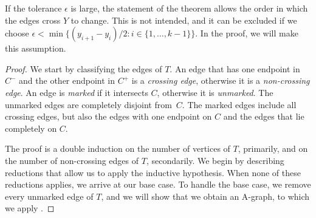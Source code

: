 If the tolerance $\epsilon$ is large, 
the statement of the theorem allows the order in which the edges cross
$Y$ to change. This is not intended, and it can be excluded if we choose
$\epsilon<\min\{(y_{i+1}-y_i)/2:i\in\{1,\ldots,k-1\}\}$. In the proof,
we will make this assumption.

\begin{proof}
  We start by classifying the edges of $T$.  An edge that has one
  endpoint in $C^-$ and the other endpoint in $C^+$ is a \emph{crossing
    edge}, otherwise it is a \emph{non-crossing edge}.
%
  An edge
  is \emph{marked} if it intersects $C$, otherwise it is
  \emph{unmarked}.  The unmarked edges are completely disjoint
  from~$C$.  The marked edges include all crossing edges, but also the
  edges with one endpoint on $C$ and the edges that lie completely on
  $C$.
	
	
	
	The proof is a double induction on the number of vertices of $T$, primarily, and on the number of non-crossing edges of $T$, secondarily.
	We begin by describing reductions that allow us to apply the
	inductive hypothesis. When none of these reductions applies,
	we arrive at our base case. To handle the base case,
	we remove every unmarked edge of $T$, and we will show that we obtain an A-graph, to which we
	apply .


\end{proof}
